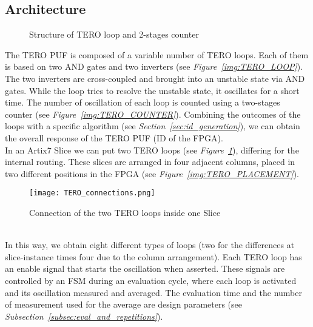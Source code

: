 \subsection{Architecture}
\begin{figure}
    \centering
    \caption{Structure of TERO loop and 2-stages counter}
\end{figure}
The TERO PUF is composed of a variable number of TERO loops. Each of them is based on
two AND gates and two inverters (see \textit{Figure~\ref{img:TERO_LOOP}}). \\
The two inverters are cross-coupled and brought into an unstable state via AND gates. 
While the loop tries to resolve the unstable state, it oscillates for a short time.
The number of oscillation of each loop is counted using a two-stages counter (see \textit{Figure~\ref{img:TERO_COUNTER}}).
Combining the outcomes of the loops with a specific algorithm (see \textit{Section~\ref{sec:id_generation}}),
we can obtain the overall response of the TERO PUF (ID of the FPGA). \\
In an Artix7 Slice we can put two TERO loops (see \textit{Figure~\ref{img:TERO_CONNECTIONS}}), differing for the internal routing.
These slices are arranged in four adjacent columns, placed in two different positions in the FPGA (see \textit{Figure~\ref{img:TERO_PLACEMENT}}).
\begin{figure}[h]
    \centering
    \texttt{[image: TERO\_connections.png]}
    \caption{Connection of the two TERO loops inside one Slice}
    \label{img:TERO_CONNECTIONS}
\end{figure} \\
In this way, we obtain eight different types of loops 
(two for the differences at slice-instance times four due to the column arrangement).
Each TERO loop has an enable signal that starts the oscillation when asserted. 
These signals are controlled by an FSM during an evaluation cycle, where each loop is activated and its oscillation measured and averaged.
The evaluation time and the number of measurement used for the average are design parameters (see \textit{Subsection~\ref{subsec:eval_and_repetitions}}).

